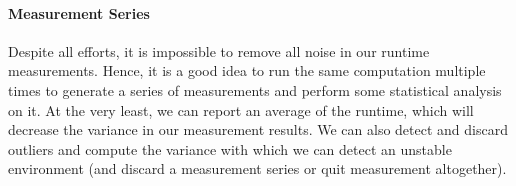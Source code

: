 \paragraph{Measurement Series}
Despite all efforts, it is impossible to remove all noise in our runtime measurements.
Hence, it is a good idea to run the same computation multiple times to generate a series of measurements and perform some statistical analysis on it.
At the very least, we can report an average of the runtime, which will decrease the variance in our measurement results.
We can also detect and discard outliers and compute the variance with which we can detect an unstable environment (and discard a measurement series or quit measurement altogether).
